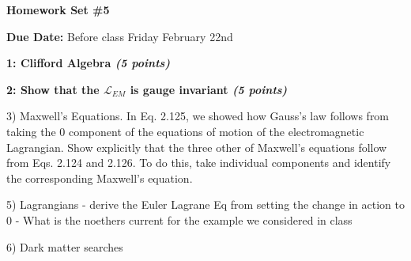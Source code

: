 
\usepackage{braket}

\def\ketY{\ensuremath{\ket {\Psi}}}
\def\iGeV{\ensuremath{\textrm{GeV}^{-1}}}
\def\mp{\ensuremath{m_{\textrm{proton}}}}
\def\rp{\ensuremath{r_{\textrm{proton}}}}
\def\me{\ensuremath{m_{\textrm{electron}}}}
\def\aG{\ensuremath{\alpha_G}}
\def\rAtom{\ensuremath{r_{\textrm{atom}}}}
\def\rNucl{\ensuremath{r_{\textrm{nucleus}}}}
\def\GN{\ensuremath{\textrm{G}_\textrm{N}}}

\def\be{\begin{equation*}}
\def\ee{\end{equation*}}


\usepackage{fancyhdr}
\usepackage{cancel}




\fancyhf{}

\thispagestyle{fancy}






\begin{center}
{\huge \textbf{Homework Set \#5}}
\large

{\textbf{ Due Date:} Before class Friday February 22nd  } 
\end{center}

{\large
\textbf{1: Clifford Algebra \hfill \textit{(5 points)} }
\vspace*{0.25in}

\textbf{2: Show that the $\mathscr{L}_{EM}$ is gauge invariant \hfill \textit{(5 points)}}


\vspace*{0.25in}




3)
Maxwell’s Equations. In Eq. 2.125, we showed how Gauss’s law follows from taking the 0 component of the equations of motion of the electromagnetic Lagrangian. Show explicitly that the three other of Maxwell’s equations follow from Eqs. 2.124 and 2.126. To do this, take individual components and identify the corresponding Maxwell’s equation.



5) Lagrangians 
  - derive the Euler Lagrane Eq from setting the change in action to 0
  - What is the noethers current for the example we considered in class

6) Dark matter searches



}






